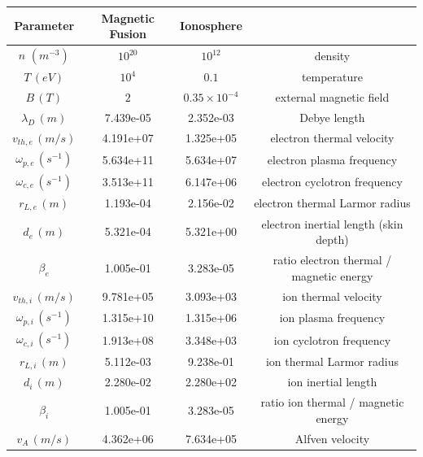 \documentclass[english]{article}
\begin{document}
\begin{tabular}{c|c|c|c}
	Parameter                & Magnetic Fusion & Ionosphere           &                                          \\\hline
	$n$ $(m^{-3})$           & $10^{20}$       & $10^{12} $           & density                                  \\
	$T\,(eV)$                & $10^4$          & $0.1$                & temperature                              \\
	$B\, (T)$                & $2$             & $0.35\times 10^{-4}$ & external magnetic field                  \\
	$\lambda_D\,(m)$         & 7.439e-05       & 2.352e-03            & Debye length                             \\
	$v_{th,e}\,(m/s)$        & 4.191e+07       & 1.325e+05            & electron thermal velocity                \\
	$\omega_{p,e}\,(s^{-1})$ & 5.634e+11       & 5.634e+07            & electron plasma frequency                \\
	$\omega_{c,e}\,(s^{-1})$ & 3.513e+11       & 6.147e+06            & electron cyclotron frequency             \\
	$r_{L,e}\,(m)$           & 1.193e-04       & 2.156e-02            & electron thermal Larmor radius           \\
	$d_e\,(m)$               & 5.321e-04       & 5.321e+00            & electron inertial length  (skin depth)   \\
	$\beta_e$                & 1.005e-01       & 3.283e-05            & ratio electron thermal / magnetic energy \\
	$v_{th,i}\,(m/s)$        & 9.781e+05       & 3.093e+03            & ion thermal velocity                     \\
	$\omega_{p,i}\,(s^{-1})$ & 1.315e+10       & 1.315e+06            & ion plasma frequency                     \\
	$\omega_{c,i}\,(s^{-1})$ & 1.913e+08       & 3.348e+03            & ion cyclotron frequency                  \\
	$r_{L,i}\,(m)$           & 5.112e-03       & 9.238e-01            & ion thermal Larmor radius                \\
	$d_i\,(m)$               & 2.280e-02       & 2.280e+02            & ion inertial length                      \\
	$\beta_i$                & 1.005e-01       & 3.283e-05            & ratio ion thermal / magnetic energy      \\
	$v_A\,(m/s)$             & 4.362e+06       & 7.634e+05            & Alfven velocity                          \\
\end{tabular}
\end{document}
